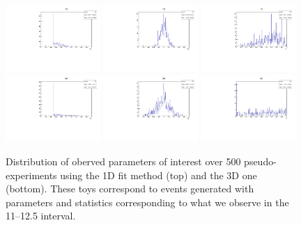 %
\begin{figure}[h]
\centering
\includegraphics[width=0.32\textwidth]{Lmumu/figs/toys3D/B2/1D/toys3D_afbB.pdf}
\includegraphics[width=0.32\textwidth]{Lmumu/figs/toys3D/B2/1D/toys3D_afb.pdf}
\includegraphics[width=0.32\textwidth]{Lmumu/figs/toys3D/B2/1D/toys3D_fL.pdf} \\
\includegraphics[width=0.32\textwidth]{Lmumu/figs/toys3D/B2/3D/toys3D_afbB.pdf}
\includegraphics[width=0.32\textwidth]{Lmumu/figs/toys3D/B2/3D/toys3D_afb.pdf}
\includegraphics[width=0.32\textwidth]{Lmumu/figs/toys3D/B2/3D/toys3D_fL.pdf} \\
\caption{Distribution of oberved parameters of interest over 500 pseudo-experiments using the 1D fit
method (top) and the 3D one (bottom). These toys correspond to events generated with parameters
and statistics corresponding to what we observe in the 11--12.5 \qsq interval. }
\label{fig:3DtoyResults_lowest_stats}
\end{figure}


